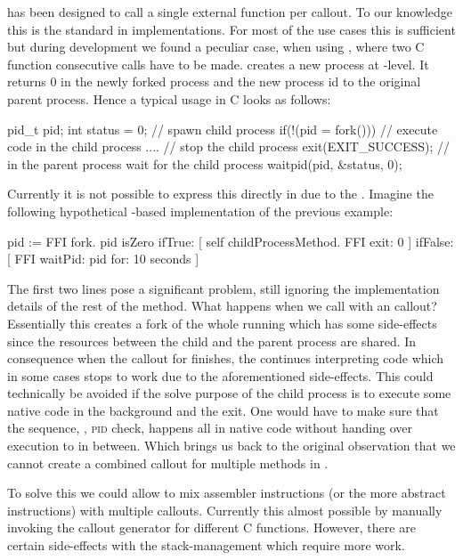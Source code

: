 \NB has been designed to call a single external function per callout.
To our knowledge this is the standard in \FFI implementations.
For most of the use cases this is sufficient but during development we found a peculiar case, when using , where two C function consecutive calls have to be made.
 creates a new process at \OS-level.
It returns $0$ in the newly forked process and the new process id to the original parent process.
Hence a typical  usage in C looks as follows:
%
\begin{ccode}{}
pid_t pid;
int status = 0;
// spawn child process 
if(!(pid = fork())) {
	// execute code in the child process
	....
	// stop the child process
	exit(EXIT_SUCCESS);
}
// in the parent process wait for the child process
waitpid(pid, &status, 0);	
\end{ccode}
%
Currently it is not possible to express this directly in \NB due to the \VM.
Imagine the following hypothetical \NB-based implementation of the previous example:
%
\begin{stcode}{}
pid := FFI fork.
pid isZero
	ifTrue: [ 
		self childProcessMethod.
		FFI exit: 0 ]
	ifFalse: [ 
		FFI waitPid: pid for: 10 seconds ]
\end{stcode}
%
The first two lines pose a significant problem, still ignoring the implementation details of the rest of the method.
What happens when we call  with an \FFI callout?
Essentially this creates a fork of the whole \VM running \PH which has some side-effects since the resources between the child and the parent \VM process are shared.
In consequence when the \FFI callout for  finishes, the \VM continues interpreting \PH code which in some cases stops to work due to the aforementioned side-effects.
This could technically be avoided if the solve purpose of the child process is to execute some native code in the background and the exit.
One would have to make sure that the sequence, , \textsc{pid} check,  happens all in native code without handing over execution to \PH in between.
Which brings us back to the original observation that we cannot create a combined \FFI callout for multiple methods in \NB.

To solve this we could allow \NB to mix assembler instructions (or the more abstract \VCPU instructions) with multiple callouts.
Currently this almost possible by manually invoking the callout generator for different C functions.
However, there are certain side-effects with the stack-management which require more work.


